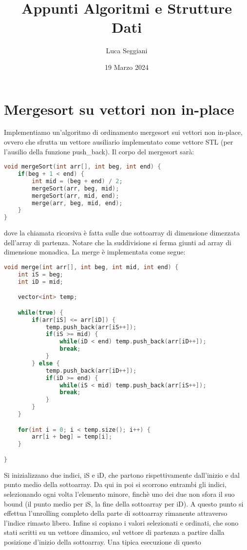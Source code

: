 \documentclass[a4paper,12pt]{article}
\title{Appunti Algoritmi e Strutture Dati}
\author{Luca Seggiani}
\date{19 Marzo 2024}
\begin{document}
\maketitle
\section{Mergesort su vettori non in-place}
Implementiamo un'algoritmo di ordinamento mergesort sui vettori non in-place, ovvero che sfrutta un vettore ausiliario implementato come vettore STL (per l'ausilio della funzione push\_back). 
Il corpo del mergesort sarà:
\begin{lstlisting}[language=C++]
void mergeSort(int arr[], int beg, int end) {
    if(beg + 1 < end) {
        int mid = (beg + end) / 2;
        mergeSort(arr, beg, mid);
        mergeSort(arr, mid, end);
        merge(arr, beg, mid, end);
    }
}
\end{lstlisting}
dove la chiamata ricorsiva è fatta sulle due sottoarray di dimensione dimezzata dell'array di partenza. Notare che la suddivisione si ferma giunti ad array di dimensione monadica. La merge
è implementata come segue:
\begin{lstlisting}[language=C++]
void merge(int arr[], int beg, int mid, int end) {
    int iS = beg;
    int iD = mid;

    vector<int> temp;

    while(true) {
        if(arr[iS] <= arr[iD]) {
            temp.push_back(arr[iS++]);
            if(iS >= mid) {
                while(iD < end) temp.push_back(arr[iD++]);
                break;
            }
        } else {
            temp.push_back(arr[iD++]);
            if(iD >= end) {
                while(iS < mid) temp.push_back(arr[iS++]);
                break;
            }
        }
    }

    for(int i = 0; i < temp.size(); i++) {
        arr[i + beg] = temp[i];
    }

}
\end{lstlisting}
Si inizializzano due indici, iS e iD, che partono rispettivamente dall'inizio e dal punto medio della sottoarray. Da qui in poi si scorrono entrambi gli indici, selezionando ogni volta l'elemento minore, finchè
uno dei due non sfora il suo bound (il punto medio per iS, la fine della sottoarray per iD). A questo punto si effettua l'unrolling completo della parte di sottoarray rimanente attraverso l'indice rimasto libero.
Infine si copiano i valori selezionati e ordinati, che sono stati scritti su un vettore dinamico, sul vettore di partenza a partire dalla posizione d'inizio della sottoarray. Una tipica esecuzione di questo
\end{document}
